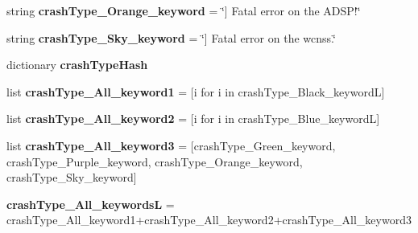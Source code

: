 \begin{DoxyCompactItemize}
\item 
\hypertarget{classsuker_r_d_a_1_1rda_pkg_1_1suker_r_d_a_body_1_1abstractor_body_af810b1ec2539074b530066da7baf0251}{string {\bfseries crash\+Type\+\_\+\+Orange\+\_\+keyword} = \char`\"{}\mbox{]} Fatal error on the A\+D\+S\+P!\char`\"{}}\label{classsuker_r_d_a_1_1rda_pkg_1_1suker_r_d_a_body_1_1abstractor_body_af810b1ec2539074b530066da7baf0251}

\item 
\hypertarget{classsuker_r_d_a_1_1rda_pkg_1_1suker_r_d_a_body_1_1abstractor_body_af6a96a12ffbff843d5c90f8ca6e30e7a}{string {\bfseries crash\+Type\+\_\+\+Sky\+\_\+keyword} = \char`\"{}\mbox{]} Fatal error on the wcnss.\char`\"{}}\label{classsuker_r_d_a_1_1rda_pkg_1_1suker_r_d_a_body_1_1abstractor_body_af6a96a12ffbff843d5c90f8ca6e30e7a}

\item 
dictionary {\bfseries crash\+Type\+Hash}
\item 
\hypertarget{classsuker_r_d_a_1_1rda_pkg_1_1suker_r_d_a_body_1_1abstractor_body_a110b8e838b7cc268f6656a30973ab652}{list {\bfseries crash\+Type\+\_\+\+All\+\_\+keyword1} = \mbox{[}i for i in crash\+Type\+\_\+\+Black\+\_\+keyword\+L\mbox{]}}\label{classsuker_r_d_a_1_1rda_pkg_1_1suker_r_d_a_body_1_1abstractor_body_a110b8e838b7cc268f6656a30973ab652}

\item 
\hypertarget{classsuker_r_d_a_1_1rda_pkg_1_1suker_r_d_a_body_1_1abstractor_body_ac73b6ed7d27906b457a0e69260919486}{list {\bfseries crash\+Type\+\_\+\+All\+\_\+keyword2} = \mbox{[}i for i in crash\+Type\+\_\+\+Blue\+\_\+keyword\+L\mbox{]}}\label{classsuker_r_d_a_1_1rda_pkg_1_1suker_r_d_a_body_1_1abstractor_body_ac73b6ed7d27906b457a0e69260919486}

\item 
\hypertarget{classsuker_r_d_a_1_1rda_pkg_1_1suker_r_d_a_body_1_1abstractor_body_a45a3e3b5681805b435126fd17def5791}{list {\bfseries crash\+Type\+\_\+\+All\+\_\+keyword3} = \mbox{[}crash\+Type\+\_\+\+Green\+\_\+keyword, crash\+Type\+\_\+\+Purple\+\_\+keyword, crash\+Type\+\_\+\+Orange\+\_\+keyword, crash\+Type\+\_\+\+Sky\+\_\+keyword\mbox{]}}\label{classsuker_r_d_a_1_1rda_pkg_1_1suker_r_d_a_body_1_1abstractor_body_a45a3e3b5681805b435126fd17def5791}

\item 
\hypertarget{classsuker_r_d_a_1_1rda_pkg_1_1suker_r_d_a_body_1_1abstractor_body_ab0a83872ce833085e90333bdbe8a3701}{{\bfseries crash\+Type\+\_\+\+All\+\_\+keywords\+L} = crash\+Type\+\_\+\+All\+\_\+keyword1+crash\+Type\+\_\+\+All\+\_\+keyword2+crash\+Type\+\_\+\+All\+\_\+keyword3}\label{classsuker_r_d_a_1_1rda_pkg_1_1suker_r_d_a_body_1_1abstractor_body_ab0a83872ce833085e90333bdbe8a3701}


\end{DoxyCompactItemize}
